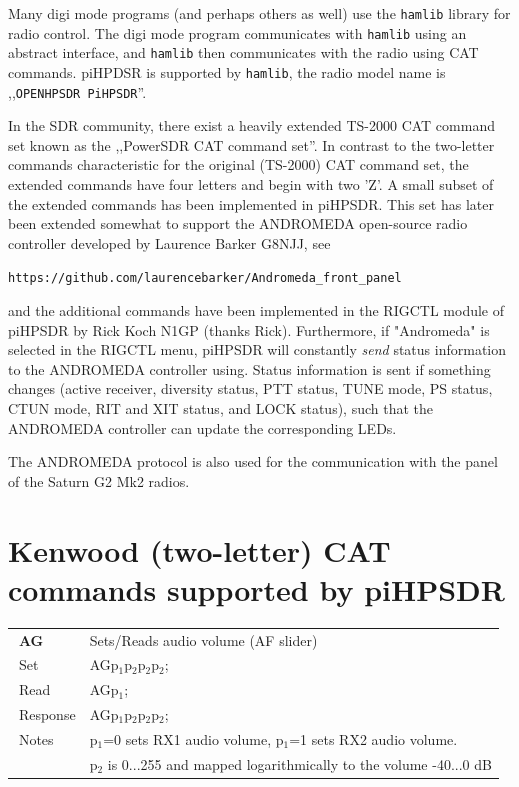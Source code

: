 \documentclass[12pt]{book}
\def\pH{pi\-HPSDR\xspace}
\begin{document}
Many digi mode programs (and perhaps others as well) use the \texttt{hamlib} library for radio control. The digi mode
program communicates with \texttt{hamlib} using an abstract interface, and \texttt{hamlib} then communicates with the radio
using CAT commands. piHPDSR is supported by \texttt{hamlib}, the radio model name is ,,\texttt{OPENHPSDR PiHPSDR}''.

In the SDR community, there exist a heavily extended TS-2000 CAT command set known as the ,,PowerSDR CAT
command set''. In contrast to the two-letter commands characteristic for the original (TS-2000) CAT
command set, the extended commands have four letters and begin with two 'Z'.
A small subset of the extended commands  has been implemented in \pH. This set has later been extended
somewhat to support the  ANDROMEDA open-source radio controller developed by Laurence Barker G8NJJ, see

\texttt{https://github.com/laurencebarker/Andromeda\_front\_panel}

and the additional commands have been implemented in
the RIGCTL module of \pH by Rick Koch N1GP (thanks Rick).
 Furthermore, if "Andromeda" is selected in the RIGCTL menu,
\pH will constantly
\textit{send} status information to the ANDROMEDA controller using. Status information is
sent if something
changes (active receiver,  diversity status, PTT status, TUNE mode, PS status, CTUN mode, RIT and XIT
status, and LOCK status),
such that the ANDROMEDA controller can update the corresponding LEDs.

The ANDROMEDA protocol is also used for the communication with the panel of the Saturn G2 Mk2 radios.


%
%



\section[Kenwood CAT commands]{Kenwood (two-letter) CAT commands supported by \pH}

\begin{center}
\begin{tabular}{|p{2cm}|p{11cm}|}
\toprule
$\phantom{\Big|}$\textbf{\large AG} & Sets/Reads audio volume (AF slider) \\\cline{1-2}
$\phantom{\Big|}${\large Set} & {AGp$_1$p$_2$p$_2$p$_2$;} \\\hline
$\phantom{\Big|}${\large Read} & {AGp$_1$;} \\\hline
$\phantom{\Big|}${\large Response} & {AGp$_1$p$_2$p$_2$p$_2$;} \\\hline
$\phantom{\Big|}${\large Notes} & \multicolumn{1}{|p{11cm}|}{p$_1$=0 sets RX1 audio volume, p$_1$=1 sets RX2 audio volume.} \\
 & \multicolumn{1}{|p{11cm}|}{p$_2$ is 0...255 and mapped logarithmically to the volume -40...0 dB} \\
\bottomrule
\end{tabular}
\end{center}
\end{document}
